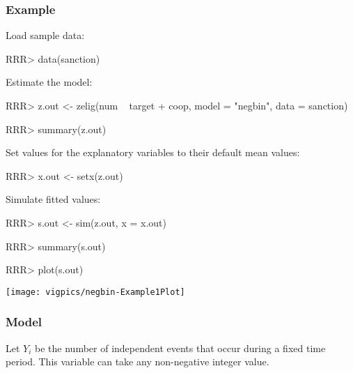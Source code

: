 \subsubsection{Example}

Load sample data:  
\begin{Schunk}
\begin{Sinput}
RRR>  data(sanction)
\end{Sinput}
\end{Schunk}
Estimate the model:  
\begin{Schunk}
\begin{Sinput}
RRR>  z.out <- zelig(num ~ target + coop, model = "negbin", data = sanction)
\end{Sinput}
\end{Schunk}
\begin{Schunk}
\begin{Sinput}
RRR> summary(z.out)
\end{Sinput}
\end{Schunk}
Set values for the explanatory variables to their default mean values:  
\begin{Schunk}
\begin{Sinput}
RRR>  x.out <- setx(z.out)
\end{Sinput}
\end{Schunk}
Simulate fitted values:  
\begin{Schunk}
\begin{Sinput}
RRR>  s.out <- sim(z.out, x = x.out)
\end{Sinput}
\end{Schunk}
\begin{Schunk}
\begin{Sinput}
RRR> summary(s.out)
\end{Sinput}
\end{Schunk}
\begin{center}
\begin{Schunk}
\begin{Sinput}
RRR>  plot(s.out)
\end{Sinput}
\end{Schunk}
\texttt{[image: vigpics/negbin-Example1Plot]}
\end{center}
\subsubsection{Model}
Let $Y_i$ be the number of independent events that occur during a
fixed time period. This variable can take any non-negative integer value.

